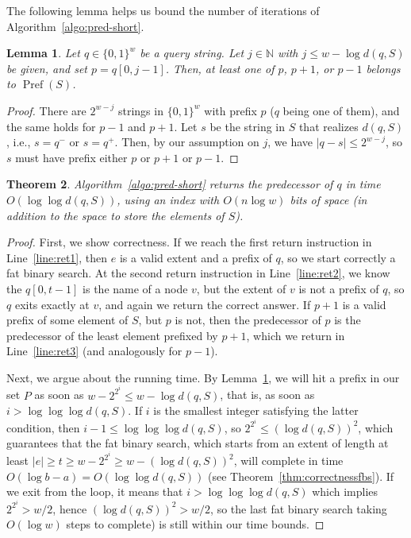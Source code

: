 \documentclass[a4paper,11pt]{article}
\newtheorem{theorem}{Theorem}[section]
\newtheorem{lemma}[theorem]{Lemma}
\newcommand{\N}{\mathbb{N}}
\newcommand{\?}{\mskip1.5mu}
\DeclareMathOperator{\Pref}{Pref}
\begin{document}
The following lemma helps us bound the number of
iterations of Algorithm~\ref{algo:pred-short}.
\begin{lemma}
\label{lemma:hitpref}
Let $q \in \{0, 1\}^w$ be a query string.
Let $j \in \N$ with $j \leq w-\log d(q,S)$ be given, 
and set $p=q[0,j - 1]$. 
Then, at least one of $p$, $p+1$, or $p-1$ 
belongs to $\Pref(S)$. 
\end{lemma}

\begin{proof}
There are $2^{w-j}$ strings in $\{0, 1\}^w$
with prefix $p$ ($q$ being one of them), and the same holds
for $p - 1$ and $p + 1$. 
Let $s$ be the string in $S$ that realizes
$d(q, S)$, i.e., $s = q^-$ or $ s = q^+$.
Then, by our assumption on $j$, we have $|q-s| \leq 2^{w-j}$, 
so $s$ must have prefix either $p$ or $p + 1$ or $p-1$.
\end{proof}


\begin{theorem}
Algorithm~\ref{algo:pred-short} returns the predecessor of $q$
in time $O(\log\log d(q,S))$, using an index with 
$O(n \log w)$ bits of space (in addition to the space 
to store the elements of $S$).
\end{theorem}

\begin{proof}
First, we show correctness. If we reach the first return
instruction in Line~\ref{line:ret1}, then $e$ is a valid 
extent and a prefix of $q$, so we start correctly a
fat binary search. At the second return instruction
in Line~\ref{line:ret2}, we know the $q[0, t - 1]$ is
the name of a node $v$, but the extent of 
$v$ is not a prefix of $q$, so
$q$ exits exactly at $v$, and again we return the correct answer. 
If $p + 1$ is a valid prefix of some element of $S$, but $p$ is not, 
then the predecessor
of $p$ is the predecessor of the least element prefixed by $p + 1$, which we
return in Line~\ref{line:ret3} (and analogously for $p - 1$).

Next, we argue about the running time.
By Lemma~\ref{lemma:hitpref}, we will hit a prefix in our set $P$ as soon as
$w - 2^{2^i} \leq w - \log d(q,S)$, that is, as soon as 
$i > \log\log\log d(q, S)$. If $i$ is the
smallest integer satisfying the latter condition, then 
$i - 1 \leq \log\log\log d(q, S)$, so $2^{2^i} \leq (\log d(q, S))^2$, 
which guarantees that the fat binary
search, which starts from an extent of length at least $|e| \geq t \geq
w - 2^{2^i} \geq w - (\log d(q, S))^2$, will complete in time 
$O(\log b - a)=O(\log\log d(q, S))$ (see Theorem~\ref{thm:correctnessfbs}). 
If we exit from the loop,
it means that $i > \log\log\log d(q, S)$ which implies $2^{2^i}>w/2$, hence
$(\log d(q,S))^2>w/2$, so the last fat binary search  taking $O(\log w)$
steps to complete) is still within our time bounds.
\end{proof}
\end{document}
